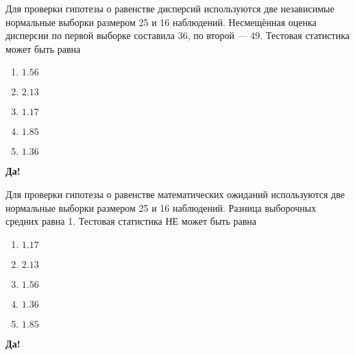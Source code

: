 \documentclass[t]{beamer}
\begin{document}
 \begin{frame} \label{3-Yes} 
\begin{block}{3} 

  Для проверки гипотезы о равенстве дисперсий используются две независимые нормальные выборки размером 25 и 16 наблюдений. Несмещённая оценка дисперсии по первой выборке составила 36, по второй — 49. Тестовая статистика может быть равна


 \end{block} 
\begin{enumerate} 
\item[] \hyperlink{3-No}{\beamergotobutton{} $1.56$}
\item[] \hyperlink{3-No}{\beamergotobutton{} $2.13$}
\item[] \hyperlink{3-No}{\beamergotobutton{} $1.17$}
\item[] \hyperlink{3-No}{\beamergotobutton{} $1.85$}
\item[] \hyperlink{3-Yes}{\beamergotobutton{} $1.36$}
\end{enumerate} 

 \textbf{Да!} 
 \hyperlink{4}{}\end{frame} 


 \begin{frame} \label{4-Yes} 
\begin{block}{4} 

  Для проверки гипотезы о равенстве математических ожиданий используются две нормальные выборки размером 25 и 16 наблюдений. Разница выборочных средних равна 1. Тестовая статистика НЕ может быть равна


 \end{block} 
\begin{enumerate} 
\item[] \hyperlink{4-No}{\beamergotobutton{} $1.17$}
\item[] \hyperlink{4-No}{\beamergotobutton{} $2.13$}
\item[] \hyperlink{4-No}{\beamergotobutton{} $1.56$}
\item[] \hyperlink{4-No}{\beamergotobutton{} $1.36$}
\item[] \hyperlink{4-No}{\beamergotobutton{} $1.85$}
\end{enumerate} 

 \textbf{Да!} 
 \hyperlink{5}{}\end{frame} 
\end{document}
